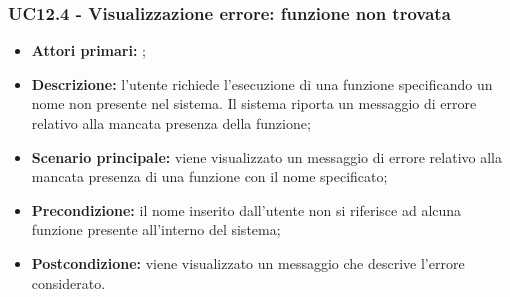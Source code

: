 \subsubsection{UC12.4 - Visualizzazione errore: funzione non trovata}
\begin{itemize}
	\item \textbf{Attori primari:} \ua{};
	\item \textbf{Descrizione:}  l’utente richiede l’esecuzione di una funzione specificando un nome non presente nel sistema. Il sistema riporta un messaggio di errore relativo alla mancata presenza della funzione;
	\item \textbf{Scenario principale:} viene visualizzato un messaggio di errore relativo alla mancata presenza di una funzione con il nome specificato; 
	\item \textbf{Precondizione:} il nome inserito dall’utente non si riferisce ad alcuna funzione presente all’interno del sistema;  
	\item \textbf{Postcondizione:} viene visualizzato un messaggio che descrive l’errore considerato. 
\end{itemize}